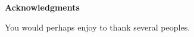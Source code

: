 \begin{center}
\textbf{Acknowledgments} 
\end{center}

You would perhaps enjoy to thank several peoples.

\newpage